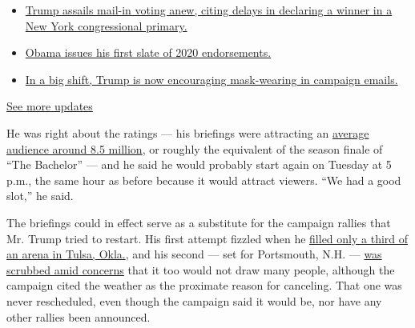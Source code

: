 \begin{itemize}
\tightlist
\item
  \href{https://www.nytimes3xbfgragh.onion/2020/08/03/us/elections/biden-vs-trump.html?action=click\&pgtype=Article\&state=default\&region=MAIN_CONTENT_1\&context=storylines_live_updates\#link-6494b448}{Trump
  assails mail-in voting anew, citing delays in declaring a winner in a
  New York congressional primary.}
\item
  \href{https://www.nytimes3xbfgragh.onion/2020/08/03/us/elections/biden-vs-trump.html?action=click\&pgtype=Article\&state=default\&region=MAIN_CONTENT_1\&context=storylines_live_updates\#link-3de249e6}{Obama
  issues his first slate of 2020 endorsements.}
\item
  \href{https://www.nytimes3xbfgragh.onion/2020/08/03/us/elections/biden-vs-trump.html?action=click\&pgtype=Article\&state=default\&region=MAIN_CONTENT_1\&context=storylines_live_updates\#link-54e34d20}{In
  a big shift, Trump is now encouraging mask-wearing in campaign
  emails.}
\end{itemize}

\href{https://www.nytimes3xbfgragh.onion/2020/08/03/us/elections/biden-vs-trump.html?action=click\&pgtype=Article\&state=default\&region=MAIN_CONTENT_1\&context=storylines_live_updates}{See
more updates}

He was right about the ratings --- his briefings were attracting an
\href{https://www.nytimes3xbfgragh.onion/2020/03/25/business/media/trump-coronavirus-briefings-ratings.html}{average
audience around 8.5 million}, or roughly the equivalent of the season
finale of ``The Bachelor'' --- and he said he would probably start again
on Tuesday at 5 p.m., the same hour as before because it would attract
viewers. ``We had a good slot,'' he said.

The briefings could in effect serve as a substitute for the campaign
rallies that Mr. Trump tried to restart. His first attempt fizzled when
he
\href{https://www.nytimes3xbfgragh.onion/2020/06/20/us/politics/tulsa-trump-rally.html}{filled
only a third of an arena in Tulsa, Okla.}, and his second --- set for
Portsmouth, N.H. ---
\href{https://www.nytimes3xbfgragh.onion/2020/07/10/us/politics/trump-nh-rally-postponed.html}{was
scrubbed amid concerns} that it too would not draw many people, although
the campaign cited the weather as the proximate reason for canceling.
That one was never rescheduled, even though the campaign said it would
be, nor have any other rallies been announced.


